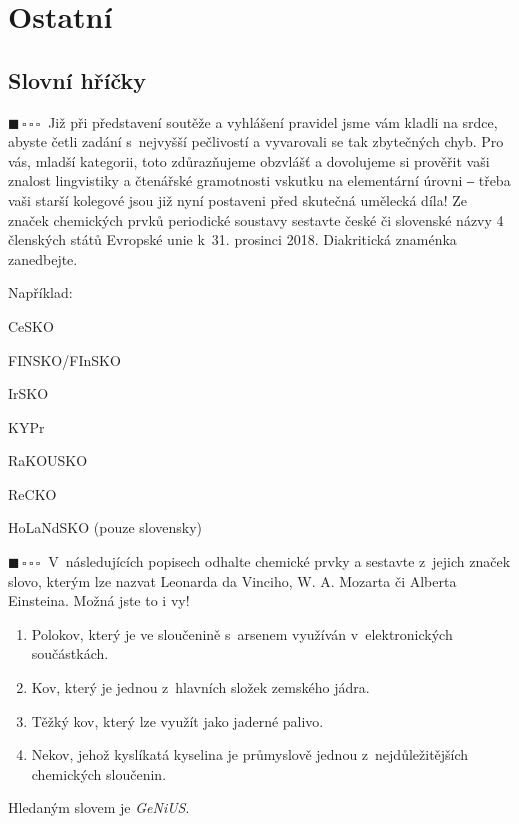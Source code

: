 \documentclass{book}
\newcommand{\jeden}{$\blacksquare \, \square \, \square \, \square \; \; $}
\renewenvironment{quotation}{\par}{\par} %
\begin{document}
\chapter{Ostatní}

\section{Slovní hříčky}

\begin{quotation}
\jeden Již při představení soutěže a vyhlášení pravidel jsme vám kladli na
srdce, abyste četli zadání s~nejvyšší pečlivostí a vyvarovali se tak
zbytečných chyb. Pro vás, mladší kategorii, toto zdůrazňujeme obzvlášť
a dovolujeme si prověřit vaši znalost lingvistiky a čtenářské gramotnosti
vskutku na elementární úrovni ‒ třeba vaši starší kolegové jsou již
nyní postaveni před skutečná umělecká díla! Ze značek chemických prvků
periodické soustavy sestavte české či slovenské názvy 4 členských
států Evropské unie k~31. prosinci 2018. Diakritická znaménka zanedbejte.
\end{quotation} \dotfill \par 
Například:

CeSKO 

FINSKO/FInSKO

IrSKO

KYPr 

RaKOUSKO 

ReCKO

HoLaNdSKO (pouze slovensky)

\hrulefill %
\begin{quotation}
\jeden V~následujících popisech odhalte chemické prvky a sestavte z~jejich značek
slovo, kterým lze nazvat Leonarda da Vinciho, W. A. Mozarta či Alberta
Einsteina. Možná jste to i vy! 
\begin{enumerate}
\item Polokov, který je ve sloučenině s~arsenem využíván v~elektronických
součástkách. 
\item Kov, který je jednou z~hlavních složek zemského jádra. 
\item Těžký kov, který lze využít jako jaderné palivo. 
\item Nekov, jehož kyslíkatá kyselina je průmyslově jednou z~nejdůležitějších
chemických sloučenin. 
\end{enumerate}
\end{quotation} \dotfill \par 
Hledaným slovem je \textit{GeNiUS}.
\end{document}
